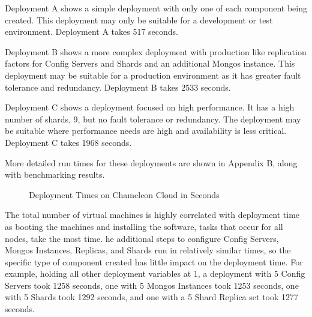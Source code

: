 \documentclass[9pt,twocolumn,twoside]{../../styles/osajnl}
\begin{document}
Deployment A shows a simple deployment with only one of each component being created.  This deployment may only be suitable for a development or test environment.  Deployment A takes 517 seconds.

Deployment B shows a more complex deployment with production like replication factors for Config Servers and Shards and an additional Mongos instance.  This deployment may be suitable for a production environment as it has greater fault tolerance and redundancy.  Deployment B takes 2533 seconds.

Deployment C shows a deployment focused on high performance.  It has a high number of shards, 9, but no fault tolerance or redundancy.  The deployment may be suitable where performance needs are high and availability is less critical.  Deployment C takes 1968 seconds.

More detailed run times for these deployments are shown in Appendix B, along with benchmarking results.

\begin{figure}[ht]
  \caption{Deployment Times on Chameleon Cloud in Seconds}
\end{figure}

The total number of virtual machines is highly correlated with deployment time as booting the machines and installing the software, tasks that occur for all nodes, take the most time.  he additional steps to configure Config Servers, Mongos Instances, Replicas, and Shards run in relatively similar times, so the specific type of component created has little impact on the deployment time.  For example, holding all other deployment variables at 1, a deployment with 5 Config Servers took 1258 seconds, one with 5 Mongos Instances took 1253 seconds, one with 5 Shards took 1292 seconds, and one with a 5 Shard Replica set took 1277 seconds.
\end{document}
